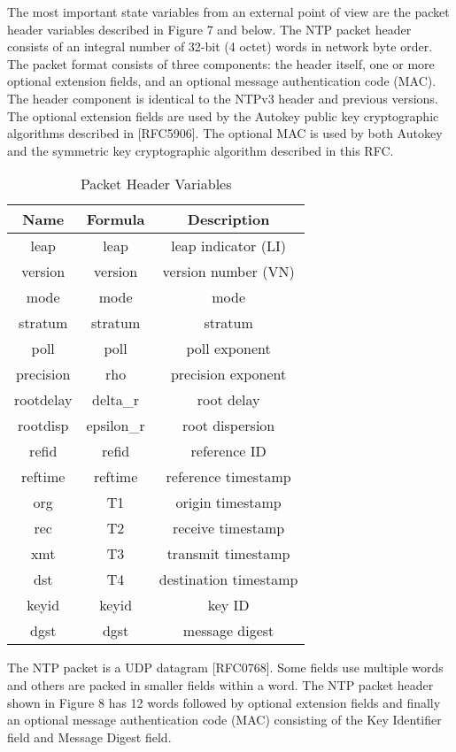 The most important state variables from an external point of view are
the packet header variables described in Figure 7 and below. The NTP
packet header consists of an integral number of 32-bit (4 octet)
words in network byte order. The packet format consists of three
components: the header itself, one or more optional extension fields,
and an optional message authentication code (MAC). The header
component is identical to the NTPv3 header and previous versions.
The optional extension fields are used by the Autokey public key
cryptographic algorithms described in [RFC5906]. The optional MAC is
used by both Autokey and the symmetric key cryptographic algorithm
described in this RFC.

\begin{table}[htb]
\center
\begin{tabular}{c | c | c}
Name & Formula & Description \\
\hline
\hline
leap & leap & leap indicator (LI) \\
version & version & version number (VN) \\
mode & mode & mode \\
stratum & stratum & stratum \\
poll & poll & poll exponent \\
precision & rho & precision exponent \\
rootdelay & delta\_r & root delay \\
rootdisp & epsilon\_r & root dispersion \\
refid & refid & reference ID \\
reftime & reftime & reference timestamp \\
org & T1 & origin timestamp \\
rec & T2 & receive timestamp \\
xmt & T3 & transmit timestamp \\
dst & T4 & destination timestamp \\
keyid & keyid & key ID \\
dgst & dgst & message digest \\
\hline
\end{tabular}
\label{packet_header_variables}
\caption{Packet Header Variables}
\end{table}

The NTP packet is a UDP datagram [RFC0768]. Some fields use multiple
words and others are packed in smaller fields within a word. The NTP
packet header shown in Figure 8 has 12 words followed by optional
extension fields and finally an optional message authentication code
(MAC) consisting of the Key Identifier field and Message Digest
field.

